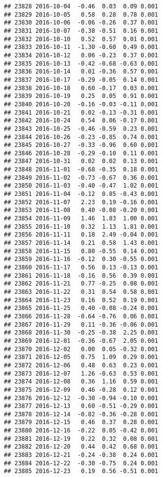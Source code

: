 \documentclass[
]{article}
\begin{document}
\begin{verbatim}
## 23828 2016-10-04  -0.46  0.03  0.09 0.001
## 23829 2016-10-05   0.58  0.28  0.78 0.001
## 23830 2016-10-06  -0.06 -0.26  0.37 0.001
## 23831 2016-10-07  -0.38 -0.51  0.16 0.001
## 23832 2016-10-10   0.52  0.57  0.01 0.001
## 23833 2016-10-11  -1.30 -0.60  0.49 0.001
## 23834 2016-10-12   0.06 -0.23  0.37 0.001
## 23835 2016-10-13  -0.42 -0.68 -0.63 0.001
## 23836 2016-10-14   0.01 -0.36  0.57 0.001
## 23837 2016-10-17  -0.29 -0.05  0.14 0.001
## 23838 2016-10-18   0.60 -0.17  0.03 0.001
## 23839 2016-10-19   0.25  0.05  0.91 0.001
## 23840 2016-10-20  -0.16 -0.03 -0.11 0.001
## 23841 2016-10-21   0.02 -0.13 -0.31 0.001
## 23842 2016-10-24   0.54  0.06 -0.17 0.001
## 23843 2016-10-25  -0.46 -0.59  0.23 0.001
## 23844 2016-10-26  -0.23 -0.85  0.74 0.001
## 23845 2016-10-27  -0.33 -0.96  0.60 0.001
## 23846 2016-10-28  -0.29 -0.10  0.11 0.001
## 23847 2016-10-31   0.02  0.02  0.13 0.001
## 23848 2016-11-01  -0.68 -0.35  0.18 0.001
## 23849 2016-11-02  -0.73 -0.67  0.36 0.001
## 23850 2016-11-03  -0.40 -0.47  1.02 0.001
## 23851 2016-11-04  -0.12  0.85 -0.43 0.001
## 23852 2016-11-07   2.23  0.19 -0.16 0.001
## 23853 2016-11-08   0.40 -0.08 -0.20 0.001
## 23854 2016-11-09   1.46  1.83  1.00 0.001
## 23855 2016-11-10   0.32  1.13  1.81 0.001
## 23856 2016-11-11   0.18  2.49 -0.04 0.001
## 23857 2016-11-14   0.21  0.58  1.43 0.001
## 23858 2016-11-15   0.80 -0.55  0.14 0.001
## 23859 2016-11-16  -0.12  0.30 -0.55 0.001
## 23860 2016-11-17   0.56  0.13 -0.13 0.001
## 23861 2016-11-18  -0.16  0.56  0.39 0.001
## 23862 2016-11-21   0.77 -0.25  0.08 0.001
## 23863 2016-11-22   0.31  0.54  0.58 0.001
## 23864 2016-11-23   0.16  0.52  0.19 0.001
## 23865 2016-11-25   0.40 -0.08 -0.24 0.001
## 23866 2016-11-28  -0.64 -0.76  0.06 0.001
## 23867 2016-11-29   0.11 -0.36 -0.06 0.001
## 23868 2016-11-30  -0.25 -0.38  2.25 0.001
## 23869 2016-12-01  -0.36 -0.67  2.05 0.001
## 23870 2016-12-02   0.00  0.05 -0.32 0.001
## 23871 2016-12-05   0.75  1.09  0.29 0.001
## 23872 2016-12-06   0.48  0.63  0.23 0.001
## 23873 2016-12-07   1.26 -0.63  0.53 0.001
## 23874 2016-12-08   0.36  1.16  0.59 0.001
## 23875 2016-12-09   0.46 -0.28  0.12 0.001
## 23876 2016-12-12  -0.30 -0.94 -0.10 0.001
## 23877 2016-12-13   0.60 -0.51 -0.29 0.001
## 23878 2016-12-14  -0.82 -0.36 -0.28 0.001
## 23879 2016-12-15   0.46  0.37  0.28 0.001
## 23880 2016-12-16  -0.22  0.05 -0.42 0.001
## 23881 2016-12-19   0.22  0.32  0.08 0.001
## 23882 2016-12-20   0.44  0.42  0.68 0.001
## 23883 2016-12-21  -0.24 -0.38  0.24 0.001
## 23884 2016-12-22  -0.30 -0.75  0.24 0.001
## 23885 2016-12-23   0.19  0.56 -0.51 0.001

\end{verbatim}
\end{document}
